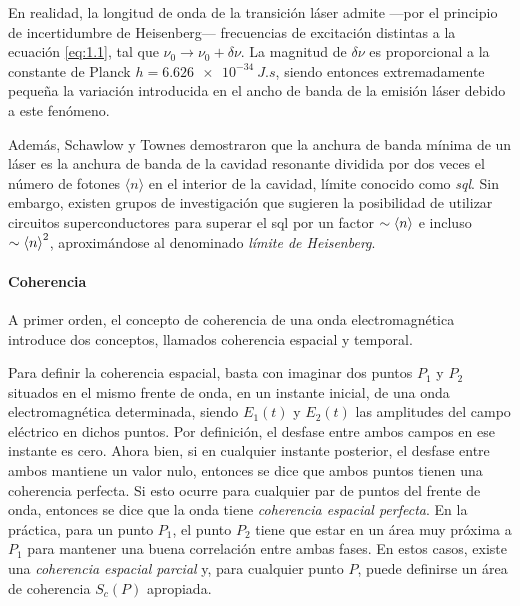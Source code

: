 En realidad, la longitud de onda de la transición láser admite ---por el principio de incertidumbre de Heisenberg--- frecuencias de excitación distintas a la ecuación \eqref{eq:1.1}, tal que $\nu_0\rightarrow\nu_0 + \delta\nu$. La magnitud de $\delta\nu$ es proporcional a la constante de Planck $h = \qty{6,626e-34}{J.s}$, siendo entonces extremadamente pequeña la variación introducida en el ancho de banda de la emisión láser debido a este fenómeno. 

Además, Schawlow y Townes demostraron que la anchura de banda mínima de un láser es la anchura de banda de la cavidad resonante dividida por dos veces el número de fotones $\langle n\rangle$ en el interior de la cavidad, límite conocido como \emph{\acrfull{sql}}. Sin embargo, existen grupos de investigación\autocite{Liu2021} que sugieren la posibilidad de utilizar circuitos superconductores para superar el \acrshort{sql} por un factor $\sim \left\langle n\right\rangle$ e incluso $\sim \left\langle n\right\rangle^{2}$, aproximándose al denominado \emph{límite de Heisenberg}.

\paragraph{Coherencia}\label{par:1.1.2.2}
A primer orden, el concepto de coherencia de una onda electromagnética introduce dos conceptos, llamados coherencia espacial y temporal\autocite{Svelto2010}.

Para definir la coherencia espacial, basta con imaginar dos puntos $P_1$ y $P_2$ situados en el mismo frente de onda, en un instante inicial, de una onda electromagnética determinada, siendo $E_1(t)$ y $E_2(t)$ las amplitudes del campo eléctrico en dichos puntos. Por definición, el desfase entre ambos campos en ese instante es cero. Ahora bien, si en cualquier instante posterior, el desfase entre ambos mantiene un valor nulo, entonces se dice que ambos puntos tienen una coherencia perfecta. Si esto ocurre para cualquier par de puntos del frente de onda, entonces se dice que la onda tiene \emph{coherencia espacial perfecta}. En la práctica, para un punto $P_1$, el punto $P_2$ tiene que estar en un área muy próxima a $P_1$ para mantener una buena correlación entre ambas fases. En estos casos, existe una \emph{coherencia espacial parcial} y, para cualquier punto $P$, puede definirse un área de coherencia $S_{c}(P)$ apropiada.

